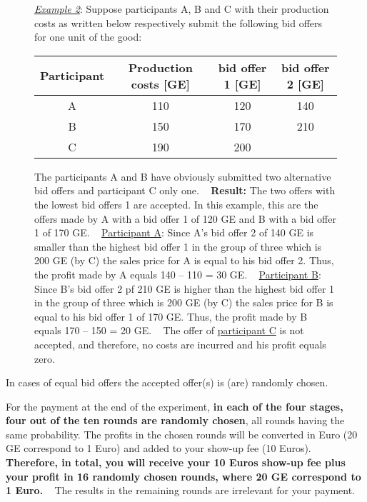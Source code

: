 \documentclass[11pt]{scrartcl}
\begin{document}
\begin{figure}[h!] 
	\begin{minipage}[t]{1\linewidth} 
		\begin{tcolorbox}[colback=pink,arc=0pt,colframe=black!25]
			\underline{\textit{Example 2}}: Suppose participants A, B and C with their production costs as written below respectively submit the following bid offers for one unit of the good:
			\begin{center}
				\begin{tabular}{c|ccc}
					Participant & Production costs [GE] & bid offer 1 [GE]	& bid offer 2 [GE] \\
					\hline
					A			& 110				 	& 120 				&	140 \\
					B			& 150	 				& 170				& 	210 \\
					C			& 190					& 200
				\end{tabular} \bigbreak	
			\end{center}	
			The participants A and B have obviously submitted two alternative bid offers and participant C only one.  ~\medbreak
			\textbf{Result:} The two offers with the lowest bid offers 1 are accepted. In this example, this are the offers made by A with a bid offer 1 of 120 GE and B with a bid offer 1 of 170 GE. ~\medbreak
			\underline{Participant A}: Since A's bid offer 2 of 140 GE is smaller than the highest bid offer 1 in the group of three which is 200 GE (by C) the sales price for A is equal to his bid offer 2. Thus, the profit made by A equals 140 – 110 = 30 GE. ~\medbreak
			\underline{Participant B}: Since B's bid offer 2 pf 210 GE is higher than the highest bid offer 1 in the group of three which is 200 GE (by C) the sales price for B is equal to his bid offer 1 of 170 GE. Thus, the profit made by B equals 170 – 150 = 20 GE. ~\medbreak			
			The offer of \underline{participant C} is not accepted, and therefore, no costs are incurred and his profit equals zero.   
		\end{tcolorbox} 		
	\end{minipage}  
\end{figure}



In cases of equal bid offers the accepted offer(s) is (are) randomly chosen.



For the payment at the end of the experiment, \textbf{in each of the four stages, four out of the ten rounds are randomly chosen}, all rounds having the same probability. The profits in the chosen rounds will be converted in Euro (20 GE correspond to 1 Euro) and added to your show-up fee (10 Euros). \textbf{Therefore, in total, you will receive your 10 Euros show-up fee plus your profit in 16 randomly chosen rounds, where 20 GE correspond to 1 Euro.} ~\bigbreak
The results in the remaining rounds are irrelevant for your payment.
\end{document}
